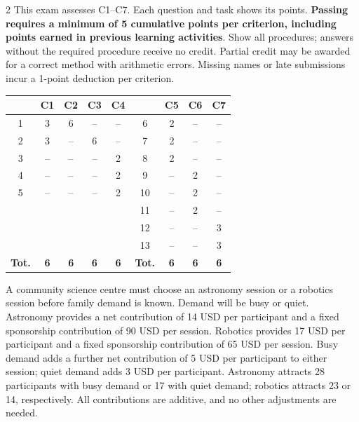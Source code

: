 \StudentInfo \vspace{-3mm}

\begin{multicols}{2}
\raggedcolumns
{}
This exam assesses C1--C7. Each question and task shows its points. \textbf{Passing requires a minimum of 5 cumulative points per criterion, including points earned in previous learning activities}. Show all procedures; answers without the required procedure receive no credit. Partial credit may be awarded for a correct method with arithmetic errors. Missing names or late submissions incur a 1-point deduction per criterion.


\begin{center}
	\small\setlength{\tabcolsep}{5pt}
	\begin{tabular}{|c|c|c|c|c||c|c|c|c|}
		\hline
		\textbf{\textnumero}&\textbf{C1}&\textbf{C2}&\textbf{C3}&\textbf{C4}&
		\textbf{\textnumero}&\textbf{C5}&\textbf{C6}&\textbf{C7}\\\hline
		1&3&6&--&--&6&2&--&--\\\hline
		2&3&--&6&--&7&2&--&--\\\hline
		3&--&--&--&2&8&2&--&--\\\hline
		4&--&--&--&2&9&--&2&--\\\hline
		5&--&--&--&2&10&--&2&--\\\hline
		&&&&&11&--&2&--\\\hline
		&&&&&12&--&--&3\\\hline
		&&&&&13&--&--&3\\\hline
		\textbf{Tot.}&\textbf{6}&\textbf{6}&\textbf{6}&\textbf{6}&
		\textbf{Tot.}&\textbf{6}&\textbf{6}&\textbf{6}\\\hline
	\end{tabular}
\end{center}


\begin{minipage}{\linewidth}
A community science centre must choose an astronomy session or a robotics session before family demand is known. Demand will be busy or quiet. Astronomy provides a net contribution of 14 USD per participant and a fixed sponsorship contribution of 90 USD per session. Robotics provides 17 USD per participant and a fixed sponsorship contribution of 65 USD per session. Busy demand adds a further net contribution of 5 USD per participant to either session; quiet demand adds 3 USD per participant. Astronomy attracts 28 participants with busy demand or 17 with quiet demand; robotics attracts 23 or 14, respectively. All contributions are additive, and no other adjustments are needed.


\end{minipage}
\end{multicols}
